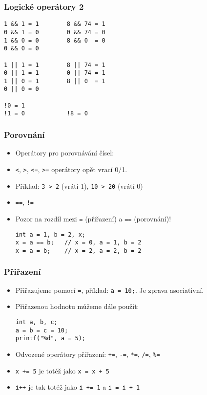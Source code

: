 \documentclass{beamer}
\newenvironment{itemizex}%
  {\large \begin{itemize}%
    \setlength{\itemsep}{8pt}%
    \setlength{\parskip}{8pt}}%
  {\end{itemize}}
\begin{document}
\begin{frame}[t,fragile]\frametitle{Logické operátory 2} 
  \begin{itemizex}
    \begin{verbatim} 
1 && 1 = 1        8 && 74 = 1
0 && 1 = 0        0 && 74 = 0
1 && 0 = 0        8 && 0  = 0
0 && 0 = 0

1 || 1 = 1        8 || 74 = 1
0 || 1 = 1        0 || 74 = 1
1 || 0 = 1        8 || 0  = 1
0 || 0 = 0

!0 = 1         
!1 = 0            !8 = 0
    \end{verbatim}
  \end{itemizex}
\end{frame}


\begin{frame}[t,fragile]\frametitle{Porovnání} 
  \begin{itemizex}
    \item Operátory pro porovnávání čísel:
    \item \texttt{<}, \texttt{>}, \texttt{<=}, \texttt{>=} operátory opět vrací 0/1. 
    \item Příklad: \texttt{3 > 2} (vrátí 1), \texttt{10 > 20} (vrátí 0)
    \item \texttt{==}, \texttt{!=}
    \item Pozor na rozdíl mezi \texttt{=} (přiřazení) a \texttt{==} (porovnání)!
    \begin{verbatim} 
int a = 1, b = 2, x;
x = a == b;   // x = 0, a = 1, b = 2
x = a = b;    // x = 2, a = 2, b = 2
    \end{verbatim}
  \end{itemizex}
\end{frame}


\begin{frame}[t,fragile]\frametitle{Přiřazení} 
  \begin{itemizex}
    \item Přiřazujeme pomocí \texttt{=}, příklad: \texttt{a = 10;}. Je zprava asociativní.
    \item Přiřazenou hodnotu můžeme dále použít:
\begin{verbatim} 
int a, b, c;
a = b = c = 10;
printf("%d", a = 5);
\end{verbatim}
  \item Odvozené operátory přiřazení: \texttt{+=}, \texttt{-=}, \texttt{*=}, \texttt{/=}, \texttt{\%=}
  \item \texttt{x += 5} je totéž jako \texttt{x = x + 5}
  \item \texttt{i++} je tak totéž jako \texttt{i += 1} a \texttt{i = i + 1}
  \end{itemizex}
\end{frame}
\end{document}
